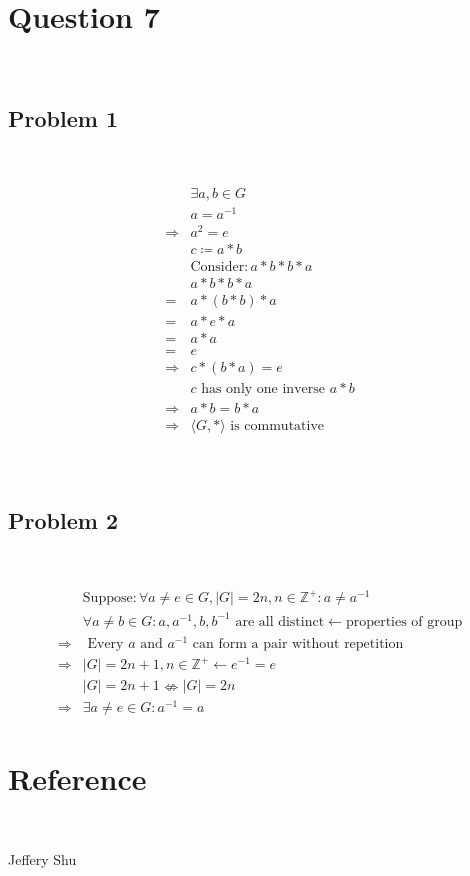 \documentclass{article}
\begin{document}
\section*{Question 7}

~

\subsection*{Problem 1}

~

\begin{equation*}
    \begin{split}
        &\exists a,b\in G\\
        &a=a^{-1}\\
        \Rightarrow&a^2=e\\
        &c\coloneqq a*b\\
        &\text{Consider}:a*b*b*a\\
        &a*b*b*a\\
        =&a*(b*b)*a\\
        =&a*e*a\\
        =&a*a\\
        =&e\\
        \Rightarrow&c*(b*a)=e\\
        &c\text{ has only one inverse } a*b\\
        \Rightarrow&a*b=b*a\\
        \Rightarrow&\langle G,*\rangle\text{ is commutative}\\
    \end{split}
\end{equation*}

~

\subsection*{Problem 2}

~

\begin{equation*}
    \begin{split}
        &\text{Suppose}: \forall a\ne e\in G,|G|=2n,n\in\mathbb{Z}^+:a\ne a^{-1}\\
        &\forall a\ne b\in G:a,a^{-1},b,b^{-1}\text{ are all distinct}\leftarrow \text{properties of group}\\
        \Rightarrow&\text{ Every }a\text{ and }a^{-1} \text{ can form a pair without repetition}\\
        \Rightarrow&|G|=2n+1,n\in \mathbb{Z}^+\leftarrow e^{-1}=e\\
        &|G|=2n+1\nLeftrightarrow |G|=2n\\
        \Rightarrow&\exists a\ne e\in G:a^{-1}=a
    \end{split}
\end{equation*}

\newpage

\section*{Reference}

~

Jeffery Shu
\end{document}
